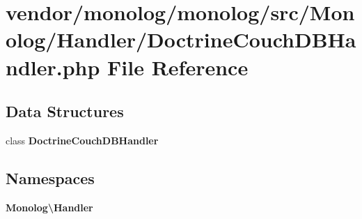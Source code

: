 \section{vendor/monolog/monolog/src/\+Monolog/\+Handler/\+Doctrine\+Couch\+D\+B\+Handler.php File Reference}
\label{_doctrine_couch_d_b_handler_8php}
\subsection*{Data Structures}
\begin{DoxyCompactItemize}
\item 
class {\bf Doctrine\+Couch\+D\+B\+Handler}
\end{DoxyCompactItemize}
\subsection*{Namespaces}
\begin{DoxyCompactItemize}
\item 
 {\bf Monolog\textbackslash{}\+Handler}
\end{DoxyCompactItemize}
